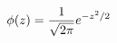 \documentclass[preview]{standalone}
\begin{document}
\begin{align*}
\special{dvisvgm:raw <g id='unique000'>}\phi(z)=\frac{1}{\sqrt{2\pi}}e^{-z^2/2}\special{dvisvgm:raw </g>}
\end{align*}
\end{document}
